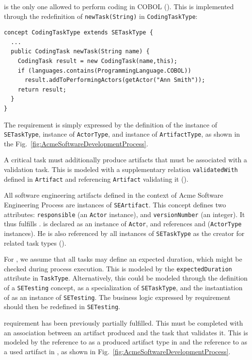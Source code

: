  is the only one allowed to perform coding in COBOL (). This is implemented through the redefinition of \texttt{newTask(String)} in \texttt{CodingTaskType}:

\begin{lstlisting}
concept CodingTaskType extends SETaskType {
  ...
  public CodingTask newTask(String name) {
    CodingTask result = new CodingTask(name,this);
    if (languages.contains(ProgrammingLanguage.COBOL))
      result.addToPerformingActors(getActor("Ann Smith"));
    return result;
  }
}
\end{lstlisting}

The requirement  is simply expressed by the definition of the
 instance of \texttt{SETaskType},  instance of
\texttt{ActorType}, and  instance of \texttt{ArtifactType},
as shown in the Fig.~\ref{fig:AcmeSoftwareDevelopmentProcess}.

A critical task must additionally produce artifacts that must be associated
with a validation task. This is modeled with a supplementary relation
\texttt{validatedWith} defined in \texttt{Artifact} and referencing
\texttt{Artifact} validating it ().

All software engineering artifacts defined in the context of Acme Software
Engineering Process are  instances of \texttt{SEArtifact}. This concept defines
two attributes: \texttt{responsible} (an \texttt{Actor} instance), and
\texttt{versionNumber} (an integer). It thus fulfills .  is declared as an instance of \texttt{Actor}, and references
 and  (\texttt{ActorType} instances). He is also
referenced by all instances of \texttt{SETaskType} as the creator for related
task types ().

For , we assume that all tasks may define an expected duration,
which might be checked during process execution. This is modeled by the
\texttt{expectedDuration} attribute in \texttt{TaskType}. Alternatively, this
could be modeled through the definition of a \texttt{SETesting} concept, as a
specialization of \texttt{SETaskType}, and the instantiation of 
as an instance of \texttt{SETesting}. The business logic expressed by
 requirement should then be redefined in \texttt{SETesting}.

 requirement has been previously partially fulfilled. This must be
completed with an association between an artifact produced and the task that
validates it. This is modeled by the reference to  as a
produced artifact type in  and the reference to
 as a used artifact in , as shown in
Fig.~\ref{fig:AcmeSoftwareDevelopmentProcess}.


